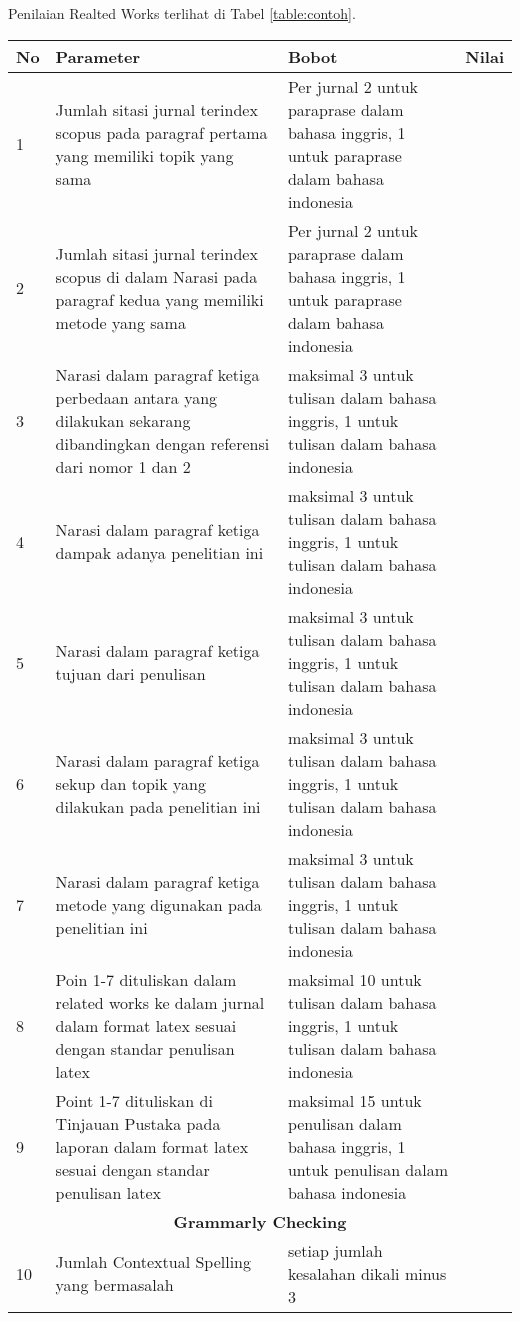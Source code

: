 Penilaian Realted Works terlihat di Tabel \ref{table:contoh}.
\begin{longtable}{|p{}|p{}|p{}|p{}|}
\hline
No&Parameter&Bobot&Nilai\\
\hline
1&Jumlah sitasi jurnal terindex scopus pada paragraf  pertama yang memiliki topik yang sama&Per jurnal 2 untuk paraprase dalam bahasa inggris, 1 untuk paraprase dalam bahasa indonesia&\\ \hline 
2&Jumlah sitasi jurnal terindex scopus di dalam Narasi pada paragraf  kedua yang memiliki metode yang sama&Per jurnal 2 untuk paraprase dalam bahasa inggris, 1 untuk paraprase dalam bahasa indonesia&\\ \hline 
3&Narasi dalam paragraf ketiga perbedaan antara yang dilakukan sekarang dibandingkan dengan referensi dari nomor 1 dan 2&maksimal 3 untuk tulisan dalam bahasa inggris, 1 untuk tulisan dalam bahasa indonesia&\\ \hline 
4&Narasi dalam paragraf ketiga dampak adanya penelitian ini&maksimal 3 untuk tulisan dalam bahasa inggris, 1 untuk tulisan dalam bahasa indonesia&\\ \hline 
5&Narasi dalam paragraf ketiga  tujuan dari penulisan&maksimal 3 untuk tulisan dalam bahasa inggris, 1 untuk tulisan dalam bahasa indonesia&\\ \hline 
6&Narasi dalam paragraf ketiga sekup dan topik yang dilakukan pada penelitian ini&maksimal 3 untuk tulisan dalam bahasa inggris, 1 untuk tulisan dalam bahasa indonesia&\\ \hline 
7&Narasi dalam paragraf ketiga metode yang digunakan pada penelitian  ini&maksimal 3 untuk tulisan dalam bahasa inggris, 1 untuk tulisan dalam bahasa indonesia&\\ \hline 
8&Poin 1-7 dituliskan dalam related works ke dalam jurnal dalam format latex sesuai dengan standar penulisan latex&maksimal 10 untuk tulisan dalam bahasa inggris, 1 untuk tulisan dalam bahasa indonesia&\\ \hline 
9&Point 1-7 dituliskan di Tinjauan Pustaka pada laporan dalam format latex sesuai dengan standar penulisan latex&maksimal 15 untuk penulisan dalam bahasa inggris, 1 untuk penulisan dalam bahasa indonesia&\\ 
\hline

\multicolumn{4}{c}{\textbf{Grammarly Checking}}\\ \hline

10 &Jumlah Contextual Spelling yang bermasalah&setiap jumlah kesalahan dikali minus 3& \\ \hline


\end{longtable}
